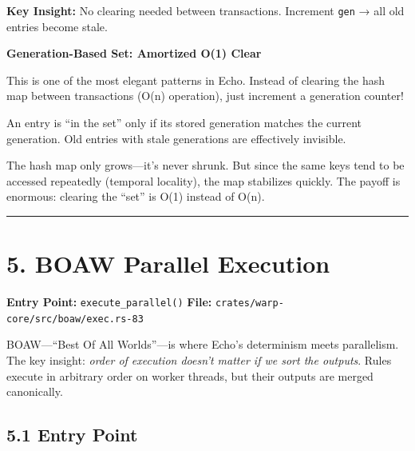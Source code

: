 \documentclass[11pt]{book}
\begin{document}
\textbf{Key Insight:} No clearing needed between transactions. Increment
\texttt{gen} → all old entries become stale.

\begin{cleverpattern}
\textbf{Generation-Based Set: Amortized O(1) Clear}

This is one of the most elegant patterns in Echo. Instead of clearing the hash map between transactions (O(n) operation), just increment a generation counter!

An entry is ``in the set'' only if its stored generation matches the current generation. Old entries with stale generations are effectively invisible.

The hash map only grows---it's never shrunk. But since the same keys tend to be accessed repeatedly (temporal locality), the map stabilizes quickly. The payoff is enormous: clearing the ``set'' is O(1) instead of O(n).
\end{cleverpattern}

\begin{center}\rule{0.5\linewidth}{0.5pt}\end{center}

\section{5. BOAW Parallel Execution}\label{boaw-parallel-execution}

\textbf{Entry Point:} \texttt{execute\_parallel()} \textbf{File:}
\texttt{crates/warp-core/src/boaw/exec.rs-83}

\begin{tourguide}
BOAW---``Best Of All Worlds''---is where Echo's determinism meets parallelism. The key insight: \emph{order of execution doesn't matter if we sort the outputs}. Rules execute in arbitrary order on worker threads, but their outputs are merged canonically.
\end{tourguide}

\subsection{5.1 Entry Point}\label{entry-point}
\end{document}
